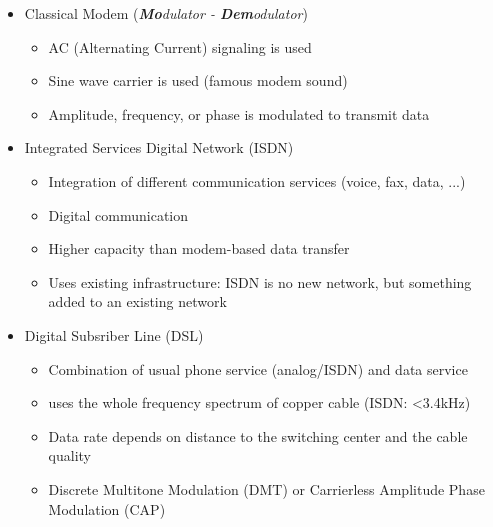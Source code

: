 \documentclass[a4paper,12pt]{article}
\begin{document}
	\begin{itemize}
		\item Classical Modem (\textit{\textbf{Mo}dulator - \textbf{Dem}odulator})
		\begin{itemize}
			\item AC (Alternating Current) signaling is used
			\item Sine wave carrier is used (famous modem sound)
			\item Amplitude, frequency, or phase is modulated to transmit data
		\end{itemize}
		\item Integrated Services Digital Network (ISDN)
		\begin{itemize}
			\item Integration of different communication services (voice, fax, data, ...)
			\item Digital communication
			\item Higher capacity than modem-based data transfer
			\item Uses existing infrastructure: ISDN is no new network, but something added to an existing network
		\end{itemize}
		\item Digital Subsriber Line (DSL)
		\begin{itemize}
			\item Combination of usual phone service (analog/ISDN) and data service
			\item uses the whole frequency spectrum of copper cable (ISDN: <3.4kHz)
			\item Data rate depends on distance to the switching center and the cable quality
			\item Discrete Multitone Modulation (DMT) or Carrierless Amplitude Phase Modulation (CAP)
		\end{itemize}
	\end{itemize}
	
\end{document}
